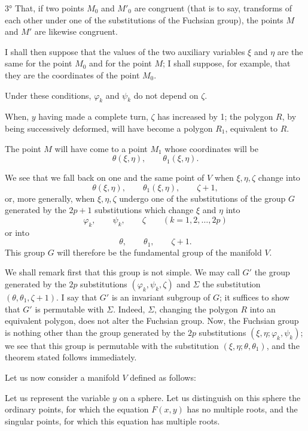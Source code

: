 \documentclass{article}
\begin{document}
3° That, if two points $M_{0}$ and $M'_{0}$ are congruent (that is to say, transforms of each other under one of the substitutions of the Fuchsian group), the points $M$ and $M'$ are likewise congruent.

I shall then suppose that the values of the two auxiliary variables $\xi$ and $\eta$ are the same for the point $M_{0}$ and for the point $M$; I shall suppose, for example, that they are the coordinates of the point $M_{0}$.

Under these conditions, $\varphi_{k}$ and $\psi_{k}$ do not depend on $\zeta$.

When, $y$ having made a complete turn, $\zeta$ has increased by 1; the polygon $R$, by being successively deformed, will have become a polygon $R_{1}$, equivalent to $R$.

The point $M$ will have come to a point $M_{1}$ whose coordinates will be
\[ \theta(\xi, \eta), \qquad \theta_{1}(\xi, \eta). \]

We see that we fall back on one and the same point of $V$ when $\xi, \eta, \zeta$ change into
\[ \theta(\xi, \eta), \qquad \theta_{1}(\xi, \eta), \qquad \zeta + 1, \]
or, more generally, when $\xi, \eta, \zeta$ undergo one of the substitutions of the group $G$ generated by the $2p + 1$ substitutions which change $\xi$ and $\eta$ into
\[ \varphi_{k}, \qquad \psi_{k}, \qquad \zeta \qquad (k = 1, 2, \ldots, 2p) \]
or into
\[ \theta, \qquad \theta_{1}, \qquad \zeta + 1. \]
This group $G$ will therefore be the fundamental group of the manifold $V$.

We shall remark first that this group is not simple. We may call $G'$ the group generated by the $2p$ substitutions $(\varphi_{k}, \psi_{k}, \zeta)$ and $\Sigma$ the substitution $(\theta, \theta_{1}, \zeta + 1)$. I say that $G'$ is an invariant subgroup of $G$; it suffices to show that $G'$ is permutable with $\Sigma$. Indeed, $\Sigma$, changing the polygon $R$ into an equivalent polygon, does not alter the Fuchsian group. Now, the Fuchsian group is nothing other than the group generated by the $2p$ substitutions $(\xi, \eta; \varphi_{k}, \psi_{k})$; we see that this group is permutable with the substitution $(\xi, \eta; \theta, \theta_{1})$, and the theorem stated follows immediately.

Let us now consider a manifold $V$ defined as follows:

Let us represent the variable $y$ on a sphere. Let us distinguish on this sphere the ordinary points, for which the equation $F(x, y)$ has no multiple roots, and the singular points, for which this equation has multiple roots.
\end{document}
